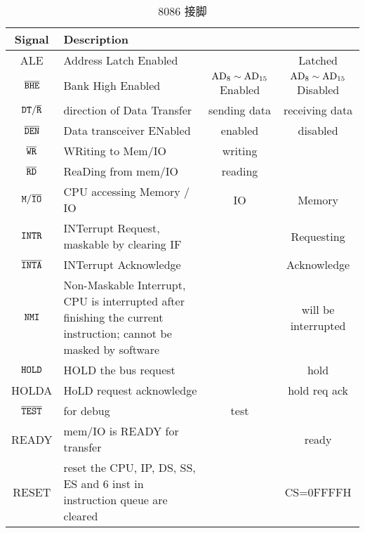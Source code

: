 \begin{table*}
	\centering
	\caption{8086 接脚}
	\begin{tabular}{|>{\ttfamily}c|p{13em}|c|c|}
		\hline
		\bfseries Signal &\bfseries Description &\ttfamily 0 &\ttfamily 1 \\
		\hline
		ALE & Address Latch Enabled &  & Latched  \\
		\hline
		$\tt \overline{BHE}$ & Bank High Enabled & $\rm AD_8\sim \rm AD_{15}$ Enabled & $\rm AD_8\sim\rm AD_{15}$ Disabled \\
		\hline
		$\tt DT/\overline{R}$ & direction of Data Transfer & sending data & receiving data \\
		\hline
		$\tt \overline{DEN}$ & Data transceiver ENabled & enabled & disabled \\
		\hline
		$\tt \overline{WR}$ & WRiting to Mem/IO & writing & \\
		\hline
		$\tt \overline{RD}$ & ReaDing from mem/IO & reading & \\
		\hline
		$\tt M/\overline{IO}$ & CPU accessing Memory / IO & IO & Memory \\
		\hline
		$\tt INTR$ & INTerrupt Request, maskable by clearing IF &  & Requesting \\
		\hline
		$\tt \overline{INTA}$ & INTerrupt Acknowledge &  & Acknowledge \\
		\hline
		$\tt NMI$ & Non-Maskable Interrupt, CPU is interrupted after finishing the current instruction; cannot be masked by software &  & will be interrupted \\
		\hline
		$\tt HOLD$ & HOLD the bus request &  & hold \\
		\hline
		HOLDA & HoLD request acknowledge &  & hold req ack \\
		\hline
		$\tt \overline{TEST}$ & for debug & test &  \\
		\hline
		READY & mem/IO is READY for transfer &  & ready \\
		\hline
		RESET & reset the CPU, IP, DS, SS, ES and 6 inst in instruction queue are cleared &  & CS=0FFFFH \\
		\hline
	\end{tabular}
\end{table*}



